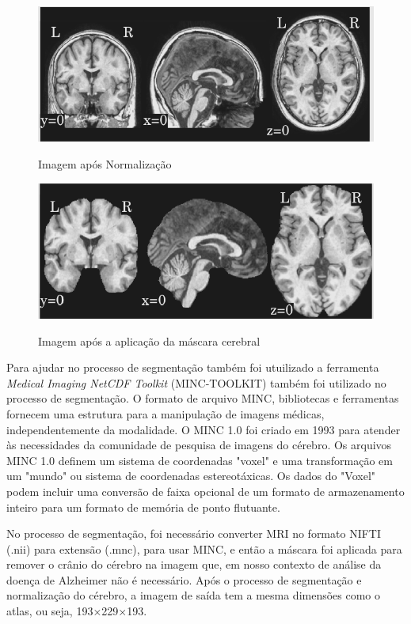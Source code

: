 \documentclass[openright]{UFRGS} %
\begin{document}
\begin{figure}[h]
    \centering
    \caption{Imagem após Normalização}
    \includegraphics[scale=0.40]{MRIG3t1Normalization.png}
    \label{fig:MRIG3t1Normalization}
\end{figure}


\begin{figure}[h]
    \centering
    \caption{Imagem após a aplicação da máscara cerebral}
    \includegraphics[scale=0.40]{MRIG3t1final.png}
    \label{fig:MRIG3t1final}
\end{figure}

Para ajudar no processo de segmentação também foi utuilizado a ferramenta \textit{Medical Imaging NetCDF Toolkit} (MINC-TOOLKIT) também foi utilizado no processo de segmentação. O formato de arquivo MINC, bibliotecas e ferramentas fornecem uma estrutura para a manipulação de imagens médicas, independentemente da modalidade. O MINC 1.0 foi criado em 1993 para atender às necessidades da comunidade de pesquisa de imagens do cérebro. 
Os arquivos MINC 1.0 definem um sistema de coordenadas "voxel" 
e uma transformação em um "mundo" ou sistema de coordenadas estereotáxicas.
Os dados do "Voxel" podem incluir uma conversão de faixa opcional de um formato de
armazenamento inteiro para um formato de memória de ponto flutuante.

No processo de segmentação, foi necessário converter MRI no formato NIFTI (.nii) para extensão (.mnc), para usar MINC,
e então a máscara foi aplicada para remover o crânio do cérebro na 
imagem que, em nosso contexto de análise da doença de Alzheimer não é necessário. Após o processo de segmentação e normalização do cérebro, a imagem de saída tem a mesma dimensões como o atlas, ou seja, 193×229×193.
\end{document}
